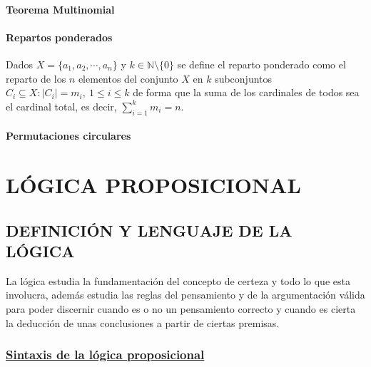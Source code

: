 \documentclass[10pt,a4paper,openright]{book}
\begin{document}
\subsubsection*{Teorema Multinomial}

\subsubsection*{Repartos ponderados}
Dados $X=\{a_1, a_2, \cdots, a_n\}$ y $k\in \mathbb N\setminus\{0\}$ se define el reparto ponderado como el reparto de los $n$ elementos del conjunto $X$ en $k$ subconjuntos $C_i\subseteq X: |C_i| = m_i,\ 1\leq i \leq k$ de forma que la suma de los cardinales de todos sea el cardinal total, es decir, $\sum_{i=1}^k m_i =n$.

\subsubsection*{Permutaciones circulares}

\chapter*{LÓGICA PROPOSICIONAL}
\section*{DEFINICIÓN Y LENGUAJE DE LA LÓGICA}
La lógica estudia la fundamentación del concepto de certeza y todo lo que esta involucra, además estudia las reglas del pensamiento y de la argumentación válida para poder discernir cuando es o no un pensamiento correcto y cuando es cierta la deducción de unas conclusiones a partir de ciertas premisas.

\subsection*{\underline{Sintaxis de la lógica proposicional}}
\end{document}
